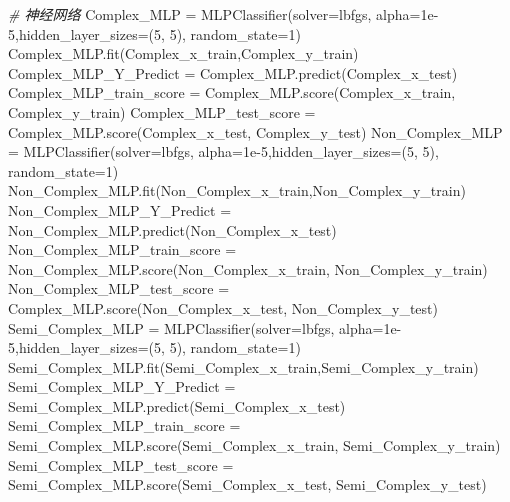 \documentclass[
]{article}
\newenvironment{Shaded}{}{}
\newcommand{\CommentTok}[1]{\textcolor[rgb]{0.38,0.63,0.69}{\textit{#1}}}
\newcommand{\DecValTok}[1]{\textcolor[rgb]{0.25,0.63,0.44}{#1}}
\newcommand{\FloatTok}[1]{\textcolor[rgb]{0.25,0.63,0.44}{#1}}
\newcommand{\NormalTok}[1]{#1}
\newcommand{\OperatorTok}[1]{\textcolor[rgb]{0.40,0.40,0.40}{#1}}
\newcommand{\StringTok}[1]{\textcolor[rgb]{0.25,0.44,0.63}{#1}}
\begin{document}
\begin{Shaded}
\begin{Highlighting}[]
\CommentTok{\# 神经网络}
\NormalTok{Complex\_MLP }\OperatorTok{=}\NormalTok{ MLPClassifier(solver}\OperatorTok{=}\StringTok{\textquotesingle{}lbfgs\textquotesingle{}}\NormalTok{, alpha}\OperatorTok{=}\FloatTok{1e{-}5}\NormalTok{,hidden\_layer\_sizes}\OperatorTok{=}\NormalTok{(}\DecValTok{5}\NormalTok{, }\DecValTok{5}\NormalTok{), random\_state}\OperatorTok{=}\DecValTok{1}\NormalTok{)}
\NormalTok{Complex\_MLP.fit(Complex\_x\_train,Complex\_y\_train)}
\NormalTok{Complex\_MLP\_Y\_Predict }\OperatorTok{=}\NormalTok{ Complex\_MLP.predict(Complex\_x\_test)}
\NormalTok{Complex\_MLP\_train\_score }\OperatorTok{=}\NormalTok{ Complex\_MLP.score(Complex\_x\_train, Complex\_y\_train)}
\NormalTok{Complex\_MLP\_test\_score }\OperatorTok{=}\NormalTok{ Complex\_MLP.score(Complex\_x\_test, Complex\_y\_test)}
\NormalTok{Non\_Complex\_MLP }\OperatorTok{=}\NormalTok{ MLPClassifier(solver}\OperatorTok{=}\StringTok{\textquotesingle{}lbfgs\textquotesingle{}}\NormalTok{, alpha}\OperatorTok{=}\FloatTok{1e{-}5}\NormalTok{,hidden\_layer\_sizes}\OperatorTok{=}\NormalTok{(}\DecValTok{5}\NormalTok{, }\DecValTok{5}\NormalTok{), random\_state}\OperatorTok{=}\DecValTok{1}\NormalTok{)}
\NormalTok{Non\_Complex\_MLP.fit(Non\_Complex\_x\_train,Non\_Complex\_y\_train)}
\NormalTok{Non\_Complex\_MLP\_Y\_Predict }\OperatorTok{=}\NormalTok{ Non\_Complex\_MLP.predict(Non\_Complex\_x\_test)}
\NormalTok{Non\_Complex\_MLP\_train\_score }\OperatorTok{=}\NormalTok{ Non\_Complex\_MLP.score(Non\_Complex\_x\_train, Non\_Complex\_y\_train)}
\NormalTok{Non\_Complex\_MLP\_test\_score }\OperatorTok{=}\NormalTok{ Complex\_MLP.score(Non\_Complex\_x\_test, Non\_Complex\_y\_test)}
\NormalTok{Semi\_Complex\_MLP }\OperatorTok{=}\NormalTok{ MLPClassifier(solver}\OperatorTok{=}\StringTok{\textquotesingle{}lbfgs\textquotesingle{}}\NormalTok{, alpha}\OperatorTok{=}\FloatTok{1e{-}5}\NormalTok{,hidden\_layer\_sizes}\OperatorTok{=}\NormalTok{(}\DecValTok{5}\NormalTok{, }\DecValTok{5}\NormalTok{), random\_state}\OperatorTok{=}\DecValTok{1}\NormalTok{)}
\NormalTok{Semi\_Complex\_MLP.fit(Semi\_Complex\_x\_train,Semi\_Complex\_y\_train)}
\NormalTok{Semi\_Complex\_MLP\_Y\_Predict }\OperatorTok{=}\NormalTok{ Semi\_Complex\_MLP.predict(Semi\_Complex\_x\_test)}
\NormalTok{Semi\_Complex\_MLP\_train\_score }\OperatorTok{=}\NormalTok{ Semi\_Complex\_MLP.score(Semi\_Complex\_x\_train, Semi\_Complex\_y\_train)}
\NormalTok{Semi\_Complex\_MLP\_test\_score }\OperatorTok{=}\NormalTok{ Semi\_Complex\_MLP.score(Semi\_Complex\_x\_test, Semi\_Complex\_y\_test)}
\end{Highlighting}
\end{Shaded}
\end{document}
